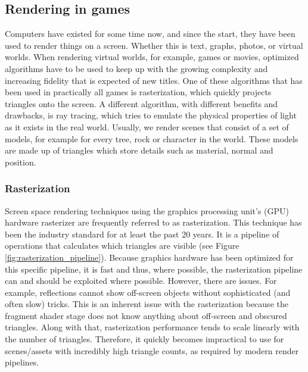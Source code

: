 \subsection{Rendering in games} \label{related_work:rendering}
Computers have existed for some time now, and since the start, they have been used to render things on a screen. Whether this is text, graphs, photos, or virtual worlds. When rendering virtual worlds, for example, games or movies, optimized algorithms have to be used to keep up with the growing complexity and increasing fidelity that is expected of new titles. One of these algorithms that has been used in practically all games is rasterization, which quickly projects triangles onto the screen. A different algorithm, with different benefits and drawbacks, is ray tracing, which tries to emulate the physical properties of light as it exists in the real world. Usually, we render scenes that consist of a set of models, for example for every tree, rock or character in the world. These models are made up of triangles which store details such as material, normal and position.


\subsubsection{Rasterization} \label{related_work:rendering:rasterization}
Screen space rendering techniques using the graphics processing unit's (GPU) hardware rasterizer are frequently referred to as rasterization. This technique has been the industry standard for at least the past 20 years. It is a pipeline of operations that calculates which triangles are visible (see Figure \ref{fig:rasterization_pipeline}). Because graphics hardware has been optimized for this specific pipeline, it is fast and thus, where possible, the rasterization pipeline can and should be exploited where possible. However, there are issues. For example, reflections cannot show off-screen objects without sophisticated (and often slow) tricks. This is an inherent issue with the rasterization because the fragment shader stage does not know anything about off-screen and obscured triangles. Along with that, rasterization performance tends to scale linearly with the number of triangles. Therefore, it quickly becomes impractical to use for scenes/assets with incredibly high triangle counts, as required by modern render pipelines.

